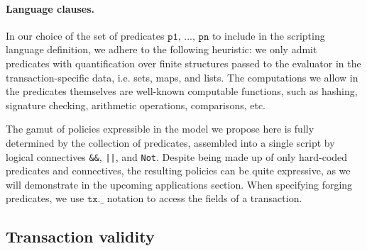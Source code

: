 \paragraph{Language clauses.}

In our choice of the set of predicates $\texttt{p1, ..., pn}$ to include in the
scripting language definition, we adhere to the following heuristic: we only
admit predicates with quantification over finite structures
passed to the evaluator in the transaction-specific data, i.e. sets,
maps, and lists. The computations we allow in the predicates themselves are well-known
computable functions, such as hashing, signature checking, arithmetic operations, comparisons,
etc.

The gamut of policies expressible in the model we propose here is
fully determined by the collection of predicates,
assembled into a single script by logical connectives
\texttt{\&\&}, \texttt{||}, and \texttt{Not}.
Despite being made up of only hard-coded predicates and connectives,
the resulting policies can be quite
expressive, as we will demonstrate in the upcoming applications section.
When specifying forging predicates, we use $\texttt{tx.\_}$ notation to access
the fields of a transaction.

\subsection{Transaction validity}
\label{sec:validity}


